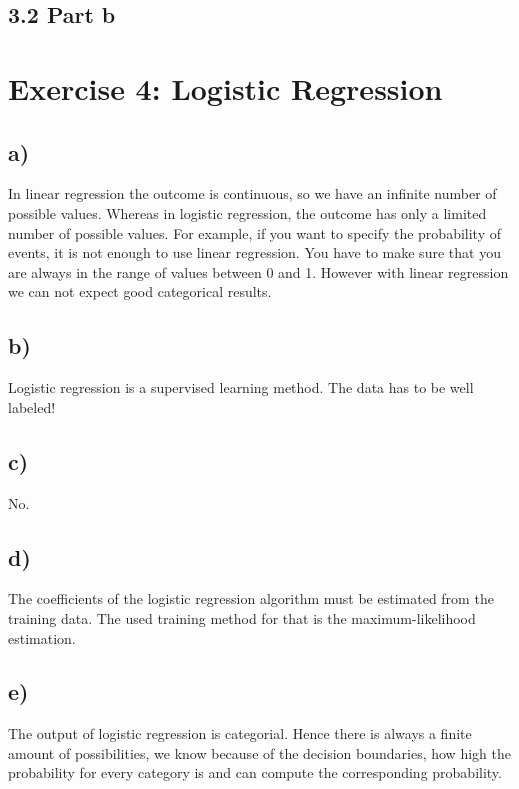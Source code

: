 \documentclass[a4paper]{article}
\begin{document}
        
        
    \subsection*{3.2 Part b}



\newpage
\section*{Exercise 4: Logistic Regression}
    \subsection*{a)}
        In linear regression the outcome is continuous, so we have an infinite number of possible values.
        Whereas in logistic regression, the outcome has only a limited number of possible values.
        For example, if you want to specify the probability of events, it is not enough to use linear regression. 
        You have to make sure that you are always in the range of values between 0 and 1.
        However with linear regression we can not expect good categorical results.
        
    \subsection*{b)}
        Logistic regression is a supervised learning method. The data has to be well labeled!
        
    \subsection*{c)}
        No.
        
    \subsection*{d)}
        The coefficients of the logistic regression algorithm must be estimated from the training data. 
        The used training method for that is the maximum-likelihood estimation.
        
    \subsection*{e)}
        The output of logistic regression is categorial.
        Hence there is always a finite amount of possibilities, we know because of the decision boundaries, how high the probability for every category is and can compute the corresponding probability.
\end{document}

